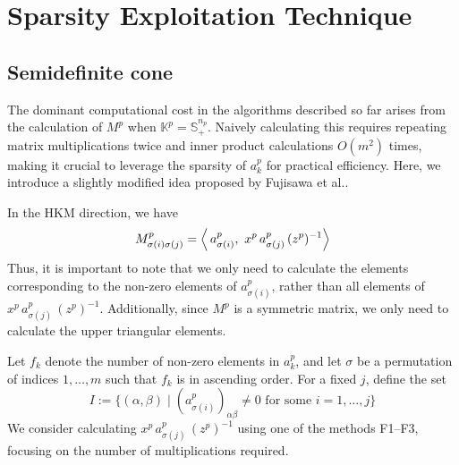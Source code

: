 \section{Sparsity Exploitation Technique} \label{sec:exploit_sparsity}
\subsection{Semidefinite cone} \label{sec:exploit_sparsity_sdp}
The dominant computational cost in the algorithms described so far arises from the calculation of $M^p$ when $\mathbb{K}^p = \mathbb{S}^{n_p}_+$. 
Naively calculating this requires repeating matrix multiplications twice and inner product calculations $O(m^2)$ times, making it crucial to leverage the sparsity of $a^p_k$ for practical efficiency. 
Here, we introduce a slightly modified idea proposed by Fujisawa et al.\cite{Fujisawa1997}.

\medskip

In the HKM direction, we have
\[
  M^p_{\sigma(i)\sigma(j)}
  = \left\langle \,a^p_{\sigma(i)}, \, \,x^p\,a^p_{\sigma(j)}\,(z^p)^{-1} \right\rangle
\]
Thus, it is important to note that we only need to calculate the elements corresponding to the non-zero elements of $a^p_{\sigma(i)}$, rather than all elements of $x^p\,a^p_{\sigma(j)}\,(z^p)^{-1}$.
Additionally, since $M^p$ is a symmetric matrix, we only need to calculate the upper triangular elements.

\medskip

Let $f_k$ denote the number of non-zero elements in $a^p_k$, and let $\sigma$ be a permutation of indices $1,\ldots,m$ such that $f_k$ is in ascending order.
For a fixed $j$, define the set
\[
  I
  := \bigl\{(\alpha,\beta)\mid (a^p_{\sigma(i)})_{\alpha\beta}\neq 0
         \text{ for some } i=1,\ldots,j \bigr\}
\]
We consider calculating $x^p\,a^p_{\sigma(j)}\,(z^p)^{-1}$ using one of the methods F1--F3, focusing on the number of multiplications required.

